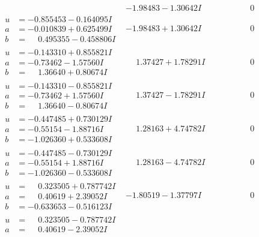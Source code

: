 \documentclass[1p]{elsarticle_modified}
\theoremstyle{definition}
\begin{document}
$$\begin{array}{c|c|c}
 & -1.98483 - 1.30642 I & \phantom{-0.000000 } 0 \\ \hline\begin{aligned}
u &= -0.855453 - 0.164095 I \\
a &= -0.010839 + 0.625499 I \\
b &= \phantom{-}0.495355 - 0.458806 I\end{aligned}
 & -1.98483 + 1.30642 I & \phantom{-0.000000 } 0 \\ \hline\begin{aligned}
u &= -0.143310 + 0.855821 I \\
a &= -0.73462 - 1.57560 I \\
b &= \phantom{-}1.36640 + 0.80674 I\end{aligned}
 & \phantom{-}1.37427 + 1.78291 I & \phantom{-0.000000 } 0 \\ \hline\begin{aligned}
u &= -0.143310 - 0.855821 I \\
a &= -0.73462 + 1.57560 I \\
b &= \phantom{-}1.36640 - 0.80674 I\end{aligned}
 & \phantom{-}1.37427 - 1.78291 I & \phantom{-0.000000 } 0 \\ \hline\begin{aligned}
u &= -0.447485 + 0.730129 I \\
a &= -0.55154 - 1.88716 I \\
b &= -1.026360 + 0.533608 I\end{aligned}
 & \phantom{-}1.28163 + 4.74782 I & \phantom{-0.000000 } 0 \\ \hline\begin{aligned}
u &= -0.447485 - 0.730129 I \\
a &= -0.55154 + 1.88716 I \\
b &= -1.026360 - 0.533608 I\end{aligned}
 & \phantom{-}1.28163 - 4.74782 I & \phantom{-0.000000 } 0 \\ \hline\begin{aligned}
u &= \phantom{-}0.323505 + 0.787742 I \\
a &= \phantom{-}0.40619 + 2.39052 I \\
b &= -0.633653 - 0.516123 I\end{aligned}
 & -1.80519 - 1.37797 I & \phantom{-0.000000 } 0 \\ \hline\begin{aligned}
u &= \phantom{-}0.323505 - 0.787742 I \\
a &= \phantom{-}0.40619 - 2.39052 I \\

\end{aligned}
\end{array}$$
\end{document}
